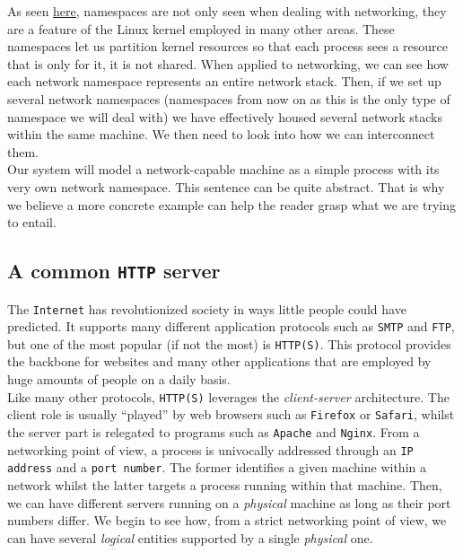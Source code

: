        As seen \href{https://en.wikipedia.org/wiki/Linux_namespaces}{here}, namespaces are not only seen when dealing with networking, they are a feature of the Linux kernel employed in many other areas. These namespaces let us partition kernel resources so that each process sees a resource that is only for it, it is not shared. When applied to networking, we can see how each network namespace represents an entire network stack. Then, if we set up several network namespaces (namespaces from now on as this is the only type of namespace we will deal with) we have effectively housed several network stacks within the same machine. We then need to look into how we can interconnect them.\\

        Our system will model a network-capable machine as a simple process with its very own network namespace. This sentence can be quite abstract. That is why we believe a more concrete example can help the reader grasp what we are trying to entail.\\

        \subsection{A common \texttt{HTTP} server}
            The \texttt{Internet} has revolutionized society in ways little people could have predicted. It supports many different application protocols such as \texttt{SMTP} and \texttt{FTP}, but one of the most popular (if not the most) is \texttt{HTTP(S)}. This protocol provides the backbone for websites and many other applications that are employed by huge amounts of people on a daily basis.\\

            Like many other protocols, \texttt{HTTP(S)} leverages the \textit{client-server} architecture. The client role is usually ``played'' by web browsers such as \texttt{Firefox} or \texttt{Safari}, whilst the server part is relegated to programs such as \texttt{Apache} and \texttt{Nginx}. From a networking point of view, a process is univocally addressed through an \texttt{IP address} and a \texttt{port number}. The former identifies a given machine within a network whilst the latter targets a process running within that machine. Then, we can have different servers running on a \textit{physical} machine as long as their port numbers differ. We begin to see how, from a strict networking point of view, we can have several \textit{logical} entities supported by a single \textit{physical} one.\\

